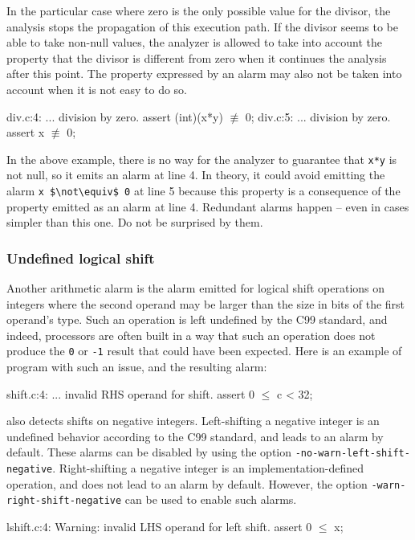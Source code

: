 \documentclass{frama-c-book}
\newcommand{\isoc}{\textsf{C99}}
\begin{document}
In the particular case where zero is the only possible value
for the divisor, the analysis stops the propagation of this
execution path.
If the divisor seems to be able to take non-null values,
the analyzer
is allowed to take into account the
property that the divisor is different from zero when it continues
the analysis after this point.
The property expressed by an alarm may also not be taken into account
when it is not easy to do so.
\begin{logs}
div.c:4: ... division by zero. assert (int)(x*y) $\not\equiv$ 0;
div.c:5: ... division by zero. assert x $\not\equiv$ 0;
\end{logs}
In the above example, there is no way for the analyzer
to guarantee that \lstinline|x*y| is not null, so it emits
an alarm at line 4. In theory, it could avoid emitting
the alarm \lstinline|x $\not\equiv$ 0| at line 5
because this property is a consequence of the property emitted
as an alarm at line 4. Redundant alarms happen -- even in cases
simpler than this one. Do not be surprised by them.

\subsubsection{Undefined logical shift}
Another arithmetic alarm is the alarm emitted for logical
shift operations on integers where the second operand may be
larger than the size in bits of the first operand's type.
Such an operation is left undefined by the \isoc{} standard, and
indeed, processors are often built in a way that such an
operation does not produce the \lstinline|0| or \lstinline|-1|
result that could have been expected. Here is an example
of program with such an issue, and the resulting alarm:
\begin{logs}
shift.c:4: ... invalid RHS operand for shift. assert 0 $\le$ c < 32;
\end{logs}

\Eva{} also detects shifts on negative integers.
Left-shifting a negative integer is an undefined behavior according to the
\isoc{} standard, and leads to an alarm by default.
These alarms can be disabled by using the option
\lstinline|-no-warn-left-shift-negative|.
Right-shifting a negative integer is an implementation-defined operation,
and does not lead to an alarm by default.
However, the option \lstinline|-warn-right-shift-negative| can be used to
enable such alarms.

\begin{logs}
 lshift.c:4: Warning:
  invalid LHS operand for left shift. assert 0 $\le$ x;
\end{logs}
\end{document}
